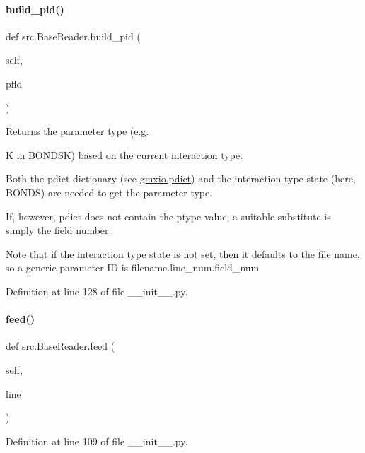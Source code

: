 \paragraph{\texorpdfstring{build\+\_\+pid()}{build\_pid()}}
{\footnotesize\ttfamily def src.\+Base\+Reader.\+build\+\_\+pid (\begin{DoxyParamCaption}\item[{}]{self,  }\item[{}]{pfld }\end{DoxyParamCaption})}



Returns the parameter type (e.\+g. 

K in B\+O\+N\+D\+SK) based on the current interaction type.

Both the \textquotesingle{}pdict\textquotesingle{} dictionary (see \hyperlink{namespacesrc_1_1gmxio_ad55e036d51846e3440a373c57439dffa}{gmxio.\+pdict}) and the interaction type \textquotesingle{}state\textquotesingle{} (here, B\+O\+N\+DS) are needed to get the parameter type.

If, however, \textquotesingle{}pdict\textquotesingle{} does not contain the ptype value, a suitable substitute is simply the field number.

Note that if the interaction type state is not set, then it defaults to the file name, so a generic parameter ID is \textquotesingle{}filename.\+line\+\_\+num.\+field\+\_\+num\textquotesingle{} 

Definition at line 128 of file \+\_\+\+\_\+init\+\_\+\+\_\+.\+py.

\mbox{\label{classsrc_1_1BaseReader_a35f2a12d14c3b94e11fe85aa8013d959}} 
\paragraph{\texorpdfstring{feed()}{feed()}}
{\footnotesize\ttfamily def src.\+Base\+Reader.\+feed (\begin{DoxyParamCaption}\item[{}]{self,  }\item[{}]{line }\end{DoxyParamCaption})}



Definition at line 109 of file \+\_\+\+\_\+init\+\_\+\+\_\+.\+py.

\mbox{\label{classsrc_1_1BaseReader_abe502aafac460a23f8594724a181c7d5}} 
